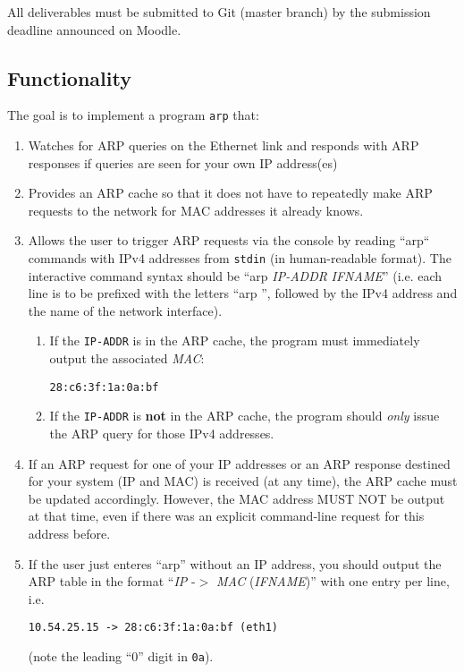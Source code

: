 \documentclass{article}
\begin{document}
All deliverables must be submitted to Git (master branch)
by the submission deadline announced on Moodle.

\subsection{Functionality}

The goal is to implement a program {\tt arp} that:
\begin{enumerate}
\item Watches for ARP queries on the Ethernet link and responds with ARP responses
  if queries are seen for your own IP address(es)
\item Provides an ARP cache so that it does not have to repeatedly
  make ARP requests to the network for MAC addresses it already knows.
\item Allows the user to trigger ARP requests via the console
  by reading ``arp`` commands with IPv4 addresses from {\tt stdin} (in human-readable format).
  The interactive command syntax should be
  ``arp {\em IP-ADDR} {\em IFNAME}'' (i.e. each line is to be prefixed with
  the letters ``arp '', followed by the IPv4 address and the name of
  the network interface).
  \begin{enumerate}
  \item
  If the {\tt IP-ADDR} is in the ARP cache, the program must immediately
  output the associated {\em MAC}:
\begin{verbatim}
28:c6:3f:1a:0a:bf
\end{verbatim}
  \item
  If the {\tt IP-ADDR} is {\bf not} in the ARP cache, the program should {\em only}
  issue the ARP query for those IPv4 addresses.
  \end{enumerate}
\item If an ARP request for one of your IP addresses
  or an ARP response destined for your system (IP and MAC)
  is received (at any time), the ARP cache must be
  updated accordingly. However, the MAC address MUST NOT be output at
  that time, even if there was an explicit command-line request for this
  address before.
\item If the user just enteres ``arp'' without
  an IP address, you should output the ARP table in the format
  ``{\em IP} -$>$ {\em MAC} ({\em IFNAME})'' with one entry per line,
  i.e.
\begin{verbatim}
10.54.25.15 -> 28:c6:3f:1a:0a:bf (eth1)
\end{verbatim}
  (note the leading ``0'' digit in {\tt 0a}).
\end{enumerate}
\end{document}
